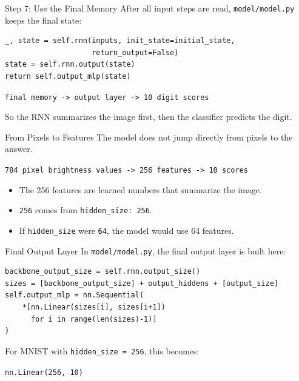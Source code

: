 \documentclass{beamer}
\begin{document}
\begin{frame}[fragile]{Step 7: Use the Final Memory}
\small
After all input steps are read, \texttt{model/model.py} keeps the final state:

\vspace{0.15cm}

\begin{verbatim}
_, state = self.rnn(inputs, init_state=initial_state,
                    return_output=False)
state = self.rnn.output(state)
return self.output_mlp(state)
\end{verbatim}

\vspace{0.2cm}

\begin{center}
\texttt{final memory -> output layer -> 10 digit scores}
\end{center}

So the RNN summarizes the image first, then the classifier predicts the digit.
\end{frame}

\begin{frame}{From Pixels to Features}
\small
The model does not jump directly from pixels to the answer.

\vspace{0.25cm}

\begin{center}
\texttt{784 pixel brightness values -> 256 features -> 10 scores}
\end{center}

\vspace{0.25cm}

\begin{itemize}
    \item The 256 features are learned numbers that summarize the image.
    \item \texttt{256} comes from \texttt{hidden\_size: 256}.
    \item If \texttt{hidden\_size} were \texttt{64}, the model would use 64 features.
\end{itemize}
\end{frame}

\begin{frame}[fragile]{Final Output Layer}
\small
In \texttt{model/model.py}, the final output layer is built here:

\vspace{0.15cm}

\begin{verbatim}
backbone_output_size = self.rnn.output_size()
sizes = [backbone_output_size] + output_hiddens + [output_size]
self.output_mlp = nn.Sequential(
    *[nn.Linear(sizes[i], sizes[i+1])
      for i in range(len(sizes)-1)]
)
\end{verbatim}

\vspace{0.15cm}

For MNIST with \texttt{hidden\_size = 256}, this becomes:

\begin{center}
\texttt{nn.Linear(256, 10)}
\end{center}
\end{frame}
\end{document}
